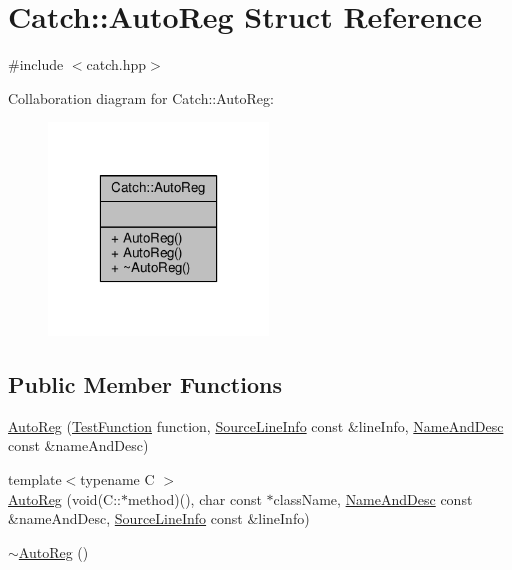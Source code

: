\hypertarget{struct_catch_1_1_auto_reg}{\section{Catch\-:\-:Auto\-Reg Struct Reference}
\label{struct_catch_1_1_auto_reg}
}


{\ttfamily \#include $<$catch.\-hpp$>$}



Collaboration diagram for Catch\-:\-:Auto\-Reg\-:
\nopagebreak
\begin{figure}[H]
\begin{center}
\leavevmode
\includegraphics[width=166pt]{struct_catch_1_1_auto_reg__coll__graph}
\end{center}
\end{figure}
\subsection*{Public Member Functions}
\begin{DoxyCompactItemize}
\item 
\hyperlink{struct_catch_1_1_auto_reg_af224f4568d57b8652474df475a164a8c}{Auto\-Reg} (\hyperlink{namespace_catch_a768da872b9033e4c71c6f316393d35db}{Test\-Function} function, \hyperlink{struct_catch_1_1_source_line_info}{Source\-Line\-Info} const \&line\-Info, \hyperlink{struct_catch_1_1_name_and_desc}{Name\-And\-Desc} const \&name\-And\-Desc)
\item 
{\footnotesize template$<$typename C $>$ }\\\hyperlink{struct_catch_1_1_auto_reg_a1bf9207fe0a02b46dc0ab1cc03cbe738}{Auto\-Reg} (void(C\-::$\ast$method)(), char const $\ast$class\-Name, \hyperlink{struct_catch_1_1_name_and_desc}{Name\-And\-Desc} const \&name\-And\-Desc, \hyperlink{struct_catch_1_1_source_line_info}{Source\-Line\-Info} const \&line\-Info)
\item 
\hyperlink{struct_catch_1_1_auto_reg_a3cdb53f1e5ff115310f3372bebe198f1}{$\sim$\-Auto\-Reg} ()
\end{DoxyCompactItemize}


